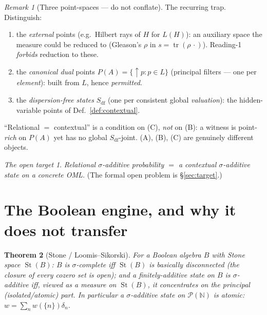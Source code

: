 \documentclass[11pt]{article}
\newtheorem{theorem}{Theorem}[section]
\theoremstyle{definition}
\theoremstyle{remark}
\newtheorem{remark}[theorem]{Remark}
\newtheorem*{target}{The open target}
\newcommand{\tr}{\operatorname{tr}}
\newcommand{\df}{\mathrm{df}}            %
\newcommand{\St}{\operatorname{St}}
\begin{document}
\begin{remark}[Three point-spaces --- do not conflate]\label{rem:threepoints}
The recurring trap. Distinguish:
\begin{enumerate}[label=\textup{(\Alph*)},nosep]
  \item the \emph{external} points (e.g.\ Hilbert rays of $H$ for $L(H)$): an
    auxiliary space the measure could be reduced to (Gleason's $\rho$ in
    $s=\tr(\rho\,\cdot)$). Reading-1 \emph{forbids} reduction to these.
  \item the \emph{canonical dual} points $P(A)=\{{\uparrow}p:p\in L\}$ (principal
    filters --- one per \emph{element}): built from $L$, hence \emph{permitted}.
  \item the \emph{dispersion-free states} $S_{\df}$ (one per consistent global
    \emph{valuation}): the hidden-variable points of Def.~\ref{def:contextual}.
\end{enumerate}
``Relational $=$ contextual'' is a condition on (C), \emph{not} on (B): a witness is
point-\emph{rich} on $P(A)$ yet has no global $S_{\df}$-joint. (A), (B), (C) are
genuinely different objects.
\end{remark}

\begin{target}
\emph{Relational $\sigma$-additive probability $=$ a contextual $\sigma$-additive
state on a concrete OML.} (The formal open problem is \S\ref{sec:target}.)
\end{target}

\section{The Boolean engine, and why it does not transfer}\label{sec:boolean}

\begin{theorem}[Stone / Loomis--Sikorski]\label{thm:stone}
For a Boolean algebra $B$ with Stone space $\St(B)$:
$B$ is $\sigma$-complete iff $\St(B)$ is \emph{basically disconnected} (the closure
of every cozero set is open); and a finitely-additive state on $B$ is
$\sigma$-additive iff, viewed as a measure on $\St(B)$, it concentrates on the
\emph{principal} (isolated/atomic) part. In particular a $\sigma$-additive state on
$\mathcal P(\mathbb N)$ is atomic: $w=\sum_n w(\{n\})\delta_n$.
\end{theorem}
\end{document}
